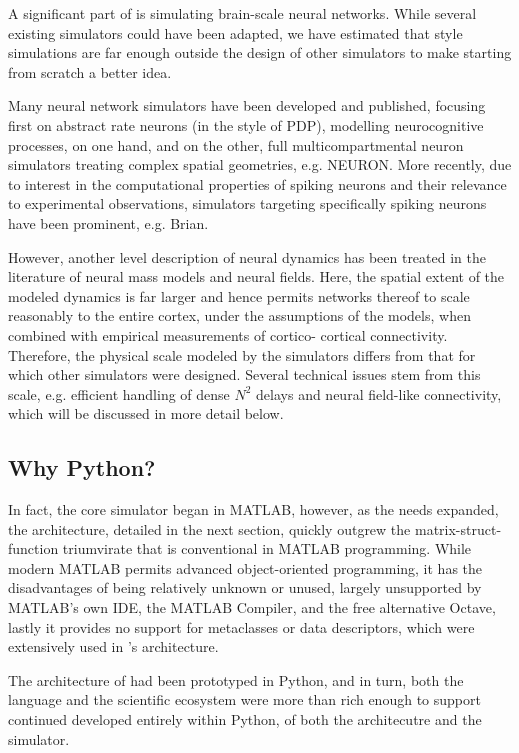 A significant part of \TVB is simulating brain-scale neural networks. While
several existing simulators could have been adapted, we have estimated that
\TVB style simulations are far enough outside the design of other simulators to
make starting from scratch a better idea.

Many neural network simulators have been developed and published, focusing
first on abstract rate neurons (in the style of PDP), modelling neurocognitive
processes, on one hand, and on the other, full multicompartmental neuron
simulators treating complex spatial geometries, e.g. NEURON.  More recently,
due to interest in the computational properties of spiking neurons and their
relevance to experimental observations, simulators targeting specifically
spiking neurons have been prominent, e.g. Brian.

However, another level description of neural dynamics has been treated
in the literature of neural mass models and neural fields. Here, the spatial
extent of the modeled dynamics is far larger and hence permits networks 
thereof to scale reasonably to the entire cortex, under the assumptions 
of the models, when combined with empirical measurements of cortico-
cortical connectivity. Therefore, the physical scale modeled by the \TVB
simulators differs from that for which other simulators were designed.
Several technical issues stem from this scale, e.g. efficient handling
of dense $N^2$ delays and neural field-like connectivity, which will be
discussed in more detail below. 

\subsection{Why Python?}

In fact, the core simulator began in MATLAB, however, as the needs 
expanded, the architecture, detailed in the next section, quickly 
outgrew the matrix-struct-function triumvirate that is conventional
in MATLAB programming. While modern MATLAB permits advanced object-oriented
programming, it has the disadvantages of being relatively unknown or unused,
largely unsupported by MATLAB's own IDE, the MATLAB Compiler, and the free
alternative Octave, lastly it provides no support for metaclasses or data
descriptors, which were extensively used in \TVB's architecture.

The architecture of \TVB had been prototyped in Python, and in turn, both the
language and the scientific ecosystem were more than rich enough to support
continued developed entirely within Python, of both the architecutre and the
simulator.

